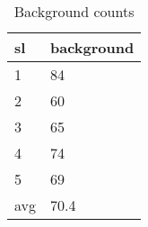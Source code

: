 \begin{table}[!ht]
    \centering
    \begin{tabular}{|l|l|}
    \hline
        sl & background \\ \hline
        1 & 84 \\ \hline
        2 & 60 \\ \hline
        3 & 65 \\ \hline
        4 & 74 \\ \hline
        5 & 69 \\ \hline
        avg & 70.4 \\ \hline
    \end{tabular}

    \caption{Background counts}
\end{table}